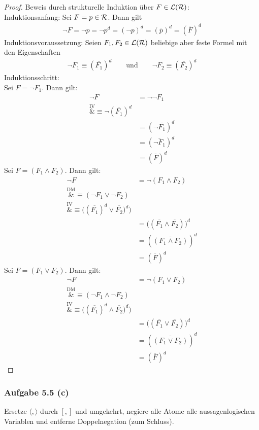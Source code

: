 \begin{proof}
	Beweis durch strukturelle Induktion über $F\in\mathcal{L}(\mathcal{R})$:\\
	Induktionsanfang: Sei $F=p\in\mathcal{R}$. Dann gilt
	\begin{align*}
		\neg F=\neg p=\neg p^d=(\neg p)^d=(\overline{p})^d=(\overline{F})^d
	\end{align*}
	Induktionsvoraussetzung: Seien $F_1,F_2\in\mathcal{L}(\mathcal{R})$ beliebige aber feste Formel mit den Eigenschaften
	\begin{align*}
		\neg F_1\equiv (\overline{F_1})^d
		\qquad\text{und}\qquad
		\neg F_2\equiv (\overline{F_2})^d
	\end{align*}
	Induktionsschritt:\\
	Sei $F=\neg F_1$. Dann gilt:
	\begin{align*}
		\neg F
		&=\neg\neg F_1\\
		\overset{\text{IV}}&{\equiv}
		\neg(\overline{F_1})^d\\
		&=(\neg\overline{F_1})^d\\
		&=(\overline{\neg F_1})^d\\
		&=(\overline{F})^d
	\end{align*}
	Sei $F=(F_1\wedge F_2)$. Dann gilt:
	\begin{align*}
		\neg F
		&=\neg(F_1\wedge F_2)\\
		\overset{\text{DM}}&{\equiv}
		(\neg F_1\vee\neg F_2)\\
		\overset{\text{IV}}&{\equiv}
		\big((\overline{F_1})^d\vee\overline{F_2})^d\big)\\
		&=\big((\overline{F_1}\wedge\overline{F_2})\big)^d\\
		&=(\overline{(F_1\wedge F_2)})^d\\
		&=(\overline{F})^d
	\end{align*}
	Sei $F=(F_1\vee F_2)$. Dann gilt:
	\begin{align*}
		\neg F
		&=\neg(F_1\vee F_2)\\
		\overset{\text{DM}}&{\equiv}
		(\neg F_1\wedge\neg F_2)\\
		\overset{\text{IV}}&{\equiv}
		\big((\overline{F_1})^d\wedge\overline{F_2})^d\big)\\
		&=\big((\overline{F_1}\vee\overline{F_2})\big)^d\\
		&=(\overline{(F_1\vee F_2)})^d\\
		&=(\overline{F})^d
	\end{align*}
\end{proof}

\subsubsection{Aufgabe 5.5 (c)}
Ersetze $\langle,\rangle$ durch $[,]$ und umgekehrt, negiere alle Atome alle aussagenlogischen Variablen und entferne Doppelnegation (zum Schluss).

